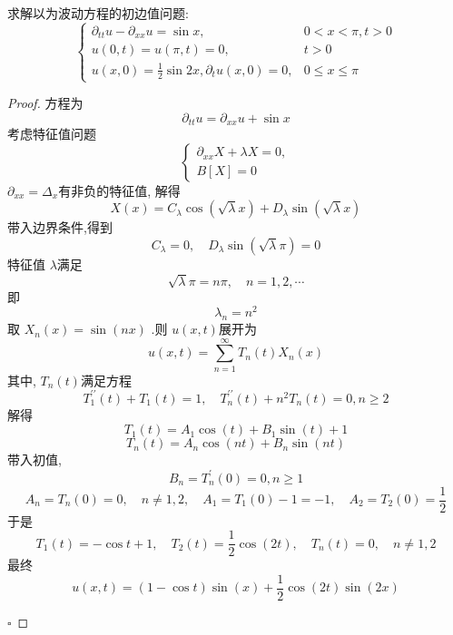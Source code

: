 \documentclass[../../main.tex]{subfiles}
\begin{document}
\begin{problemsec}
    
\end{problemsec}
\begin{problem}
    求解以为波动方程的初边值问题: \[
    \begin{cases}  \partial _{tt}u-  \partial _{x x }u= \sin x,&0< x< \pi ,t> 0\\ 
     u\left( 0,t \right)= u\left( \pi ,t \right)= 0,&t> 0\\ 
      u\left( x,0 \right)= \frac{1 }{2 }\sin 2x, \partial _{t}u\left( x,0 \right)= 0,&0\le x\le \pi       \end{cases} 
    \]
\end{problem}

\begin{proof}
    
    方程为 \[
     \partial _{tt}u=  \partial _{xx }u+ \sin x
    \]考虑特征值问题 \[
    \begin{cases}  \partial _{x x}X+  \lambda X=  0,\\ 
     B[X]= 0 \end{cases} 
    \]\(   \partial _{x x}=  \Delta _{x}  \)有非负的特征值, 解得 \[
    X\left( x \right) = C_{ \lambda }\cos \left( \sqrt{ \lambda }x \right)  + D_{ \lambda }\sin \left(  \sqrt{ \lambda }x\right) 
    \]带入边界条件,得到 \[
    C_{ \lambda }= 0,\quad D_{ \lambda }\sin \left( \sqrt{ \lambda }\pi  \right)= 0 
    \]特征值 \(   \lambda   \)满足 \[
    \sqrt{ \lambda }\pi = n\pi ,\quad n = 1,2,\cdots 
    \]  即 \[
     \lambda _{n}= n^{2}
    \]取 \(  X_{n}\left( x \right)= \sin \left( nx \right)    \) .则 \(  u\left( x,t \right)   \)展开为 \[
    u\left( x,t \right)= \sum _{n = 1}^{\infty}T_{n}\left( t \right) X_{n}\left( x \right)  
    \] 其中, \(  T_{n}\left( t \right)   \)满足方程 \[
    T_1^{\prime \prime} \left( t \right)+ T_1\left( t \right)= 1,\quad T_{n}^{\prime \prime} \left( t \right)+ n^{2}T_{n}\left( t \right)= 0,n\ge 2    
    \] 解得  \[
    T_1\left( t \right)= A_1\cos \left( t \right)+ B_1\sin \left( t \right)+ 1   
    \] \[
    T_{n}\left( t \right)= A_{n}\cos \left( nt \right)+ B_{n}\sin \left( nt \right)   
    \]带入初值, \[
   B_{n}=  T_{n}^{\prime} \left( 0 \right)=  0, n\ge 1
    \] \[
    A_{n}= T_{n}\left( 0 \right)=  0,\quad n \neq 1, 2,\quad A_1= T_{1}\left( 0 \right)-1=- 1,\quad  A_2= T_2\left( 0 \right)= \frac{1}{2} 
    \]于是 \[
    T_1\left( t \right)=  -\cos t+ 1,\quad T_{2}\left( t \right) = \frac{1}{2}\cos \left( 2t \right),\quad T_{n}\left( t \right)= 0,\quad n \neq 1,2  
    \]最终 \[
    u\left( x,t \right)= \left( 1-\cos t \right)\sin \left( x \right)+ \frac{1}{2}\cos \left( 2t \right)    \sin \left( 2x \right) 
    \]

    \hfill $\square$
\end{proof}
\end{document}
